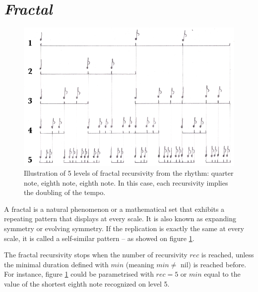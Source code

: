 
\section{\textsl{Fractal}}

\label{imp3}

\begin{figure}[H]
\begin{center}
\includegraphics[scale=1.7]{img/1548}
\caption{Illustration of 5 levels of fractal recursivity from the rhythm: quarter note, eighth note, eighth note. In this case, each recursivity implies the doubling of the tempo.}
\label{fractal}
\end{center}
\end{figure}

{A fractal is a natural phenomenon or a mathematical set that exhibits a repeating pattern that displays at every scale. It is also known as expanding symmetry or evolving symmetry. If the replication is exactly the same at every scale, it is called a self-similar pattern -- as showed on figure \ref{fractal}. 

 }


The fractal recursivity stops when the number of recursivity $rec$ is reached, unless the minimal duration defined with $min$ (meaning $min \ne$ nil) is reached before. For instance, figure \ref{fractal} could be parametrised with $rec=5$ or $min$ equal to the value of the shortest eighth note recognized on level 5. 


